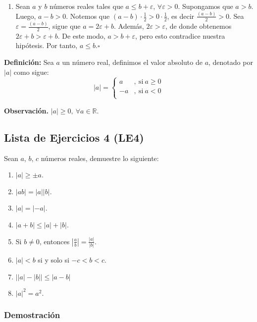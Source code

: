 \documentclass[11pt]{article}
\newcommand{\R}{\mathbb{R}}
\begin{document}
\begin{enumerate}[label=\alph*),font=\bfseries]
    \item Sean $a$ y $b$ números reales tales que $a \leq b + \varepsilon$, $\forall \varepsilon > 0$. Supongamos que $a > b$. Luego, $a-b>0$. Notemos que $(a-b) \cdot \frac{1}{2} > 0 \cdot \frac{1}{2}$, es decir $\frac{(a-b)}{2} > 0$. Sea $\varepsilon = \frac{(a-b)}{2}$, sigue que $a=2\varepsilon+b$. Además, $2\varepsilon > \varepsilon$, de donde obtenemos $2 \varepsilon + b > \varepsilon + b$. De este modo, $a > b+\varepsilon$, pero esto contradice nuestra hipótesis. Por tanto, $a \leq b$.\mbox{}\hfill $\square$

\end{enumerate}

\textbf{Definición:} Sea $a$ un número real, definimos el valor absoluto de $a$, denotado por $|a|$ como sigue: 
    \[
    |a| = 
    \left \{
        \begin{aligned}
        a &,\ \text{si} \ a \geq 0\\
        -a &,\ \text{si} \ a < 0 \\
        \end{aligned}
    \right .
    \]

\textbf{Observación.} $|a|\geq 0, \ \forall a\in \R$.

\subsection*{Lista de Ejercicios 4 (LE4)}

Sean $a$, $b$, $c$ números reales, demuestre lo siguiente:

\begin{enumerate}[label=\alph*),font=\bfseries]
    \item $|a| \geq \pm a$. %
    \item $|ab|=|a||b|$. %
    \item $|a|=|-a|$. %
    \item $|a+b|\leq |a|+|b|$. %
    \item Si $b\neq 0$, entonces $\left| \frac{a}{b} \right| = \frac{|a|}{|b|}$. %
    \item $|a|<b$ si y solo si $-c<b<c$. %
    \item $ \big| |a|-|b| \big| \leq |a-b|$ %
    \item $|a|^2=a^2$.
\end{enumerate}

\subsubsection*{Demostración}
\end{document}
